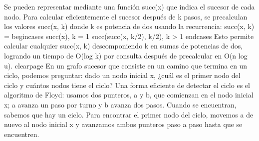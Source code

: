 {}Se pueden representar mediante una función succ(x) que indica el sucesor de cada nodo.  Para calcular eficientemente el sucesor después de k pasos, se precalculan los valores succ(x, k) donde k es potencia de dos usando la recurrencia:\markdownRendererParagraphSeparator
{}\markdownRendererDollarSign{}\markdownRendererDollarSign{}\markdownRendererSoftLineBreak
{}succ(x, k) =\markdownRendererSoftLineBreak
{}\markdownRendererBackslash{}begin\markdownRendererLeftBrace{}cases\markdownRendererRightBrace{}\markdownRendererSoftLineBreak
{}succ(x), \markdownRendererAmpersand{} k = 1 \markdownRendererBackslash{}\markdownRendererBackslash{}\markdownRendererSoftLineBreak
{}succ(succ(x, k/2), k/2), \markdownRendererAmpersand{} k > 1\markdownRendererSoftLineBreak
{}\markdownRendererBackslash{}end\markdownRendererLeftBrace{}cases\markdownRendererRightBrace{}\markdownRendererSoftLineBreak
{}\markdownRendererDollarSign{}\markdownRendererDollarSign{}\markdownRendererParagraphSeparator
{}Esto permite calcular cualquier succ(x, k) descomponiendo k en sumas de potencias de dos, logrando un tiempo de \markdownRendererDollarSign{}O(\markdownRendererBackslash{}log k)\markdownRendererDollarSign{} por consulta después de precalcular en \markdownRendererDollarSign{}O(n \markdownRendererBackslash{}log u)\markdownRendererDollarSign{}.\markdownRendererInterblockSeparator
{}\markdownRendererInterblockSeparator
{}\markdownRendererDollarSign{}\markdownRendererBackslash{}clearpage\markdownRendererDollarSign{}\markdownRendererInterblockSeparator
{}\markdownRendererSectionBegin
{}\markdownRendererInterblockSeparator
{}En un grafo sucesor que consiste en un camino que termina en un ciclo, podemos preguntar: dado un nodo inicial \markdownRendererDollarSign{}x\markdownRendererDollarSign{}, ¿cuál es el primer nodo del ciclo y cuántos nodos tiene el ciclo?\markdownRendererHardLineBreak
{}Una forma eficiente de detectar el ciclo es el algoritmo de Floyd: usamos dos punteros, \markdownRendererDollarSign{}a\markdownRendererDollarSign{} y \markdownRendererDollarSign{}b\markdownRendererDollarSign{}, que comienzan en el nodo inicial \markdownRendererDollarSign{}x\markdownRendererDollarSign{}; \markdownRendererDollarSign{}a\markdownRendererDollarSign{} avanza un paso por turno y \markdownRendererDollarSign{}b\markdownRendererDollarSign{} avanza dos pasos. Cuando se encuentran, sabemos que hay un ciclo.\markdownRendererParagraphSeparator
{}Para encontrar el primer nodo del ciclo, movemos \markdownRendererDollarSign{}a\markdownRendererDollarSign{} de nuevo al nodo inicial \markdownRendererDollarSign{}x\markdownRendererDollarSign{} y avanzamos ambos punteros paso a paso hasta que se encuentren.\markdownRendererParagraphSeparator
